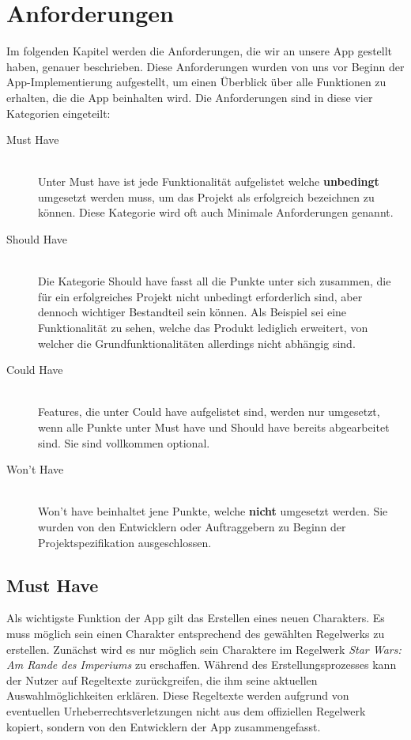 \section{Anforderungen}
Im folgenden Kapitel werden die Anforderungen, die wir an unsere App gestellt haben, genauer beschrieben. Diese Anforderungen wurden von uns vor Beginn der App-Implementierung aufgestellt, um einen Überblick über alle Funktionen zu erhalten, die die App beinhalten wird. Die Anforderungen sind in diese vier Kategorien eingeteilt:
\begin{description}
\item[Must Have]\hfill \\
Unter \grqq Must have\grqq{} ist jede Funktionalität aufgelistet welche \textbf{unbedingt} umgesetzt werden muss, um das Projekt als erfolgreich bezeichnen zu können. Diese Kategorie wird oft auch \grqq Minimale Anforderungen\grqq{} genannt.
\item[Should Have]\hfill \\
Die Kategorie \grqq Should have\grqq{} fasst all die Punkte unter sich zusammen, die für ein erfolgreiches Projekt nicht unbedingt erforderlich sind, aber dennoch wichtiger Bestandteil sein können. Als Beispiel sei eine Funktionalität zu sehen, welche das Produkt lediglich erweitert, von welcher die Grundfunktionalitäten allerdings nicht abhängig sind.
\item [Could Have]\hfill \\
Features, die unter \grqq Could have\grqq{} aufgelistet sind, werden nur umgesetzt, wenn alle Punkte unter \grqq Must have\grqq{} und \grqq Should have\grqq{} bereits abgearbeitet sind. Sie sind vollkommen optional.
\item[Won't Have]\hfill \\
\grqq Won't have\grqq{} beinhaltet jene Punkte, welche \textbf{nicht} umgesetzt werden. Sie wurden von den Entwicklern oder Auftraggebern zu Beginn der Projektspezifikation ausgeschlossen.
\end{description}

\subsection{Must Have}
Als wichtigste Funktion der App gilt das Erstellen eines neuen Charakters. Es muss möglich sein einen Charakter entsprechend des gewählten Regelwerks zu erstellen. Zunächst wird es nur möglich sein Charaktere im Regelwerk \textit{Star Wars: Am Rande des Imperiums} zu erschaffen. Während des Erstellungsprozesses kann der Nutzer auf Regeltexte zurückgreifen, die ihm seine aktuellen Auswahlmöglichkeiten erklären. Diese Regeltexte werden aufgrund von eventuellen Urheberrechtsverletzungen nicht aus dem offiziellen Regelwerk kopiert, sondern von den Entwicklern der App zusammengefasst.\\

